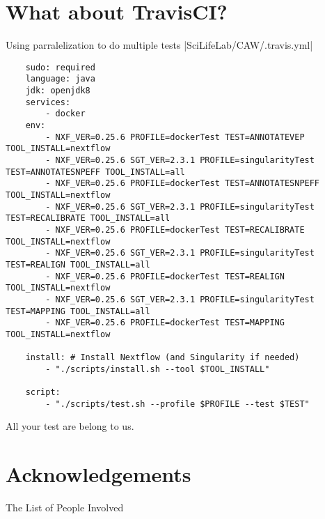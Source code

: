\documentclass{beamer}
\begin{document}
\section{What about TravisCI?}

\begin{frame}[fragile]{Using parralelization to do multiple tests}
|SciLifeLab/CAW/.travis.yml|
\begin{verbatim}
	sudo: required
	language: java
	jdk: openjdk8
	services:
		- docker
	env:
		- NXF_VER=0.25.6 PROFILE=dockerTest TEST=ANNOTATEVEP TOOL_INSTALL=nextflow
		- NXF_VER=0.25.6 SGT_VER=2.3.1 PROFILE=singularityTest TEST=ANNOTATESNPEFF TOOL_INSTALL=all
		- NXF_VER=0.25.6 PROFILE=dockerTest TEST=ANNOTATESNPEFF TOOL_INSTALL=nextflow
		- NXF_VER=0.25.6 SGT_VER=2.3.1 PROFILE=singularityTest TEST=RECALIBRATE TOOL_INSTALL=all
		- NXF_VER=0.25.6 PROFILE=dockerTest TEST=RECALIBRATE TOOL_INSTALL=nextflow
		- NXF_VER=0.25.6 SGT_VER=2.3.1 PROFILE=singularityTest TEST=REALIGN TOOL_INSTALL=all
		- NXF_VER=0.25.6 PROFILE=dockerTest TEST=REALIGN TOOL_INSTALL=nextflow
		- NXF_VER=0.25.6 SGT_VER=2.3.1 PROFILE=singularityTest TEST=MAPPING TOOL_INSTALL=all
		- NXF_VER=0.25.6 PROFILE=dockerTest TEST=MAPPING TOOL_INSTALL=nextflow

	install: # Install Nextflow (and Singularity if needed)
		- "./scripts/install.sh --tool $TOOL_INSTALL"

	script:
		- "./scripts/test.sh --profile $PROFILE --test $TEST"
\end{verbatim}
\end{frame}

\begin{frame}{All your test are belong to us.}
\end{frame}


\section{Acknowledgements}

\begin{frame}{The List of People Involved}
	\begin{table}
	\end{table}

\end{frame}
\end{document}
